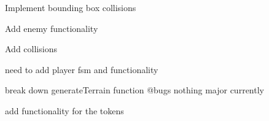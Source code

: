 
\begin{DoxyRefList}
\item[Class \mbox{\hyperlink{class_bounding_box}{Bounding\+Box}} ]\label{todo__todo000001}%
%
Implement bounding box collisions  
\item[Class \mbox{\hyperlink{class_enemy}{Enemy}} ]\label{todo__todo000002}%
%
Add enemy functionality 
\item[Class \mbox{\hyperlink{class_game_object}{Game\+Object}} ]\label{todo__todo000003}%
%
Add collisions 
\item[Class \mbox{\hyperlink{class_player}{Player}} ]\label{todo__todo000005}%
%
need to add player fsm and functionality 
\item[Class \mbox{\hyperlink{class_terrain}{Terrain}} ]\label{todo__todo000004}%
%
break down generate\+Terrain function @bugs nothing major currently 
\item[Class \mbox{\hyperlink{class_token}{Token}} ]\label{todo__todo000006}%
%
add functionality for the tokens
\end{DoxyRefList}
